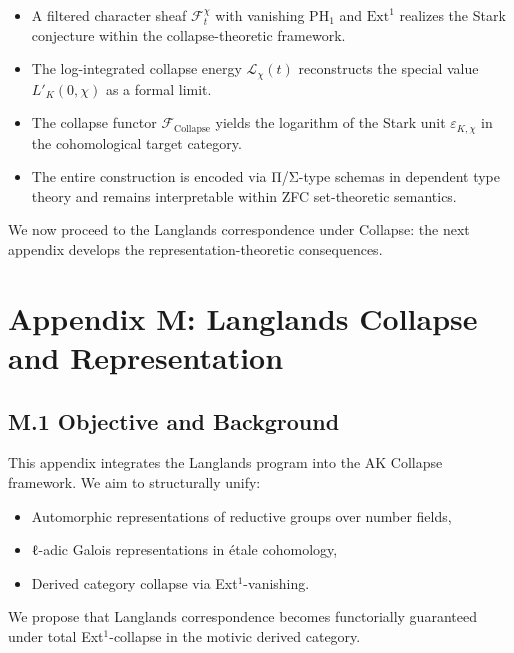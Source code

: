 \documentclass[11pt]{article}
\begin{document}
\begin{itemize}
  \item A filtered character sheaf $\mathcal{F}^\chi_t$ with vanishing $\mathrm{PH}_1$ and $\mathrm{Ext}^1$ realizes the Stark conjecture within the collapse-theoretic framework.
  \item The log-integrated collapse energy $\mathcal{L}_\chi(t)$ reconstructs the special value $L'_K(0,\chi)$ as a formal limit.
  \item The collapse functor $\mathcal{F}_{\mathrm{Collapse}}$ yields the logarithm of the Stark unit $\varepsilon_{K,\chi}$ in the cohomological target category.
  \item The entire construction is encoded via Π/Σ-type schemas in dependent type theory and remains interpretable within ZFC set-theoretic semantics.
\end{itemize}


We now proceed to the Langlands correspondence under Collapse: the next appendix develops the representation-theoretic consequences.




\section*{Appendix M: Langlands Collapse and Representation}

\subsection*{M.1 Objective and Background}

This appendix integrates the Langlands program into the AK Collapse framework. We aim to structurally unify:

\begin{itemize}
  \item Automorphic representations of reductive groups over number fields,
  \item ℓ-adic Galois representations in étale cohomology,
  \item Derived category collapse via Ext$^1$-vanishing.
\end{itemize}

We propose that Langlands correspondence becomes functorially guaranteed under total Ext$^1$-collapse in the motivic derived category.
\end{document}
